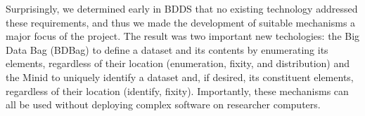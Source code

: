 \documentclass[11pt]{article}
\begin{document}

Surprisingly, we determined early in BDDS that no existing technology addressed these requirements,
and thus we made the development of suitable mechanisms a major focus of the project.
The result was two important new techologies:
the Big Data Bag (BDBag) to define a dataset and its contents by enumerating its elements, regardless of their location (enumeration, fixity, and distribution)
and the Minid to uniquely identify a dataset and, if desired, its constituent elements, regardless of their location (identify, fixity).
Importantly, these mechanisms can all be used without deploying complex software on researcher computers.
\end{document}
